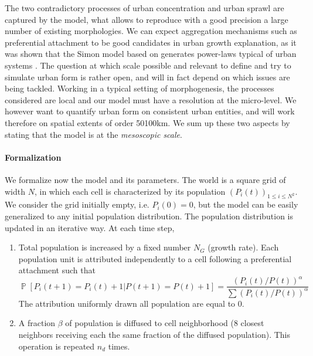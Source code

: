 \documentclass[10pt,letterpaper]{article}
\DeclareMathOperator{\Proba}{\mathbb{P}}
\newcommand{\Pb}[1]{\ensuremath{\Proba\!\left[#1\right]}}
\begin{document}
The two contradictory processes of urban concentration and urban sprawl are captured by the model, what allows to reproduce with a good precision a large number of existing morphologies. We can expect aggregation mechanisms such as preferential attachment to be good candidates in urban growth explanation, as it was shown that the Simon model based on  generates power-laws typical of urban systems . The question at which scale  possible and relevant to define and try to simulate urban form is rather open, and will in fact depend on which issues are being tackled. Working in a typical setting of morphogenesis, the processes considered are local and our model must have a resolution at the micro-level. We however want to quantify urban form on consistent urban entities, and will work therefore on spatial extents of order 50\added{-}100km. We sum up these two aspects by stating that the model is at the \emph{mesoscopic scale}. 


\paragraph*{Formalization}

We formalize now the model and its parameters. The world is a square grid of width $N$, in which each cell is characterized by its population $(P_i(t))_{1\leq i\leq N^2}$. We consider  the grid initially empty, i.e. $P_i(0)=0$, but the model can be easily generalized to any initial population distribution. The population distribution is updated in an iterative way. At each time step,

\begin{enumerate}
\item Total population is increased by a fixed number $N_G$ (growth rate). Each population unit is attributed independently to a cell following a preferential attachment such that 
\begin{equation}
\Pb{P_i(t+1)=P_i(t)+1|P(t+1)=P(t)+1}=\frac{(P_i(t)/P(t))^{\alpha}}{\sum(P_i(t)/P(t))^{\alpha}}
\end{equation}
The attribution  uniformly drawn  all  population are equal to 0.
\item A fraction $\beta$ of population is diffused to cell neighborhood (8 closest neighbors receiving each the same fraction of the diffused population). This operation is repeated $n_d$ times.
\end{enumerate}
\end{document}
